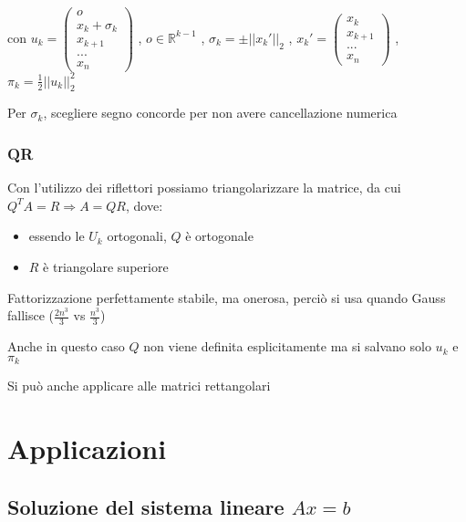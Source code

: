 \documentclass[openany]{book}
\begin{document}
\\

con \quad $u_k=\left( \begin{array}{c} o \\ x_k + \sigma_k \\ x_{k+1} \\ ... \\ x_n \end{array} \right)$ 
\quad , \quad 
 $o\in \mathbb{R}^{k-1}$ \quad , \quad
$\sigma_k = \pm ||x_k'||_2$ \quad , \quad 
$x_k'= \left( \begin{array}{c} x_k \\ x_{k+1} \\ ... \\ x_n \end{array} \right)$ \quad , \quad 
$\pi_k=\frac{1}{2}||u_k||_2^2$ 

Per $\sigma_k$, scegliere segno concorde per non avere cancellazione numerica

\subsubsection{QR}


Con l'utilizzo dei riflettori possiamo triangolarizzare la matrice, da cui $Q^TA=R \Rightarrow A=QR$, dove:

\begin{itemize}
	\item essendo le $U_k$ ortogonali, $Q$ è ortogonale
	\item $R$ è triangolare superiore
\end{itemize}

Fattorizzazione perfettamente stabile, ma onerosa, perciò si usa quando Gauss fallisce ($\frac{2n^3}{3}$ vs 
$\frac{n^3}{3}$)

Anche in questo caso $Q$ non viene definita esplicitamente ma si salvano solo $u_k$ e $\pi_k$

Si può anche applicare alle matrici rettangolari

\newpage

\section{Applicazioni}
\subsection{Soluzione del sistema lineare $Ax=b$}
\end{document}
